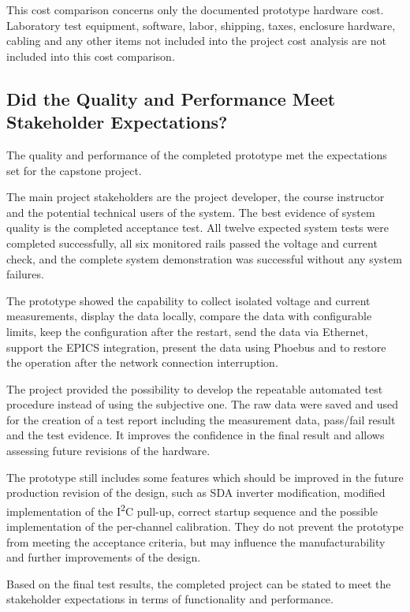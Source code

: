 This cost comparison concerns only the documented prototype hardware cost. Laboratory test equipment, software, labor, shipping, taxes, enclosure hardware, cabling and any other items not included into the project cost analysis are not included into this cost comparison.

\subsection{Did the Quality and Performance Meet Stakeholder Expectations?}

The quality and performance of the completed prototype met the expectations set for the capstone project.

The main project stakeholders are the project developer, the course instructor and the potential technical users of the system. The best evidence of system quality is the completed acceptance test. All twelve expected system tests were completed successfully, all six monitored rails passed the voltage and current check, and the complete system demonstration was successful without any system failures.

The prototype showed the capability to collect isolated voltage and current measurements, display the data locally, compare the data with configurable limits, keep the configuration after the restart, send the data via Ethernet, support the EPICS integration, present the data using Phoebus and to restore the operation after the network connection interruption.

The project provided the possibility to develop the repeatable automated test procedure instead of using the subjective one. The raw data were saved and used for the creation of a test report including the measurement data, pass/fail result and the test evidence. It improves the confidence in the final result and allows assessing future revisions of the hardware.

The prototype still includes some features which should be improved in the future production revision of the design, such as SDA inverter modification, modified implementation of the I\textsuperscript{2}C pull-up, correct startup sequence and the possible implementation of the per-channel calibration. They do not prevent the prototype from meeting the acceptance criteria, but may influence the manufacturability and further improvements of the design.

Based on the final test results, the completed project can be stated to meet the stakeholder expectations in terms of functionality and performance.

